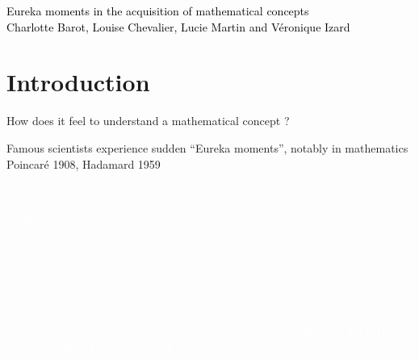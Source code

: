 \documentclass[11pt]{beamer}
\begin{document}
{  {\textcolor{black}{Eureka moments in the acquisition of mathematical concepts}}\\
  {\small {\textcolor{black}{Charlotte Barot, Louise Chevalier, Lucie Martin and  V\'{e}ronique Izard }}}\\
        
     }

  
        \begin{frame}
          \titlepage
        \end{frame}



        \section{Introduction}

        \begin{frame}
          
          How does it feel to understand a mathematical concept ?

        \end{frame}


        

             
        \begin{frame}
          Famous scientists experience sudden \textcolor{bittersweet}{``Eureka moments''}, notably in mathematics \footnotesize{Poincar\'{e} 1908, Hadamard 1959}

          \normalsize
          
          \textcolor{white}{Sudden and unexpected understanding}

          \textcolor{white}{Feeling of certainty}


          \textcolor{white}{Similar experiences are studied in the scope of problem solving where solutions come by ``insight''}

          \textcolor{white}{No awareness that it was about to come  \footnotesize{Metcalfe 1986, Metcalfe and Wiebe 1987, Bowden and Jung-Beeman 2003}}

          \normalsize

          \textcolor{white}{Immediately perceived as correct and relevant \footnotesize{Kounios and Beeman 2014, Danek and Wiley 2017, Laukkonen et al. 2020}}
 

        \end{frame}

   
                
\end{document}
